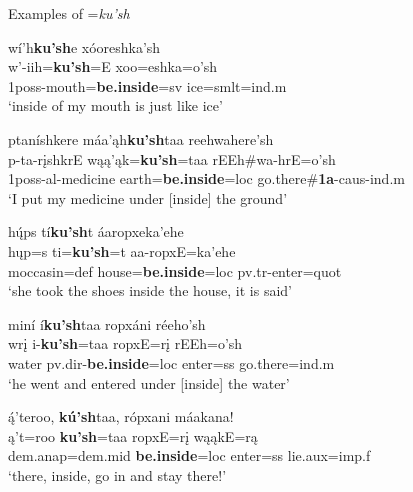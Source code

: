 \begin{exe}

\item\label{ExamplesOfKush} Examples of =\textit{ku'sh}

\begin{xlist}

\item\label{ExamplesOfKush1} \glll wí'h\textbf{ku'sh}e xóoreshka'sh\\
    w'-iih=\textbf{ku'sh}=E xoo=eshka=o'sh\\
    1poss-\textnormal{mouth}=\textbf{\textnormal{\bfseries be.inside}}=sv \textnormal{ice}=smlt=ind.m\\
    \glt `inside of my mouth is just like ice' \citep[119]{hollow1973a}

\item\label{ExamplesOfKush2} \glll  ptaníshkere máa'ąh\textbf{ku'sh}taa reehwahere'sh\\
	p-ta-rįshkrE wąą'ąk=\textbf{ku'sh}=taa rEEh\#wa-hrE=o'sh\\
	1poss-al-\textnormal{medicine} \textnormal{earth}=\textbf{\textnormal{\bfseries be.inside}}=loc \textnormal{go.there}\#\textbf{1a}-caus-ind.m\\
	\glt `I put my medicine under [inside] the ground' \citep[48]{hollow1973a}    
	
\item\label{ExamplesOfKush3} \glll hų́ps tí\textbf{ku'sh}t áaropxeka'ehe\\
    hųp=s ti=\textbf{ku'sh}=t aa-ropxE=ka'ehe\\
    \textnormal{moccasin}=def \textnormal{house}=\textbf{\textnormal{\bfseries be.inside}}=loc pv.tr-\textnormal{enter}=quot\\
    \glt `she took the shoes inside the house, it is said' \citep[169]{hollow1973a}
    
\item\label{ExamplesOfKush4} \glll miní í\textbf{ku'sh}taa ropxáni réeho'sh\\
    wrį i-\textbf{ku'sh}=taa ropxE=rį rEEh=o'sh\\
    \textnormal{water} pv.dir-\textbf{\textnormal{\bfseries be.inside}}=loc \textnormal{enter}=ss \textnormal{go.there}=ind.m\\
    \glt `he went and entered under [inside] the water' \citep[10]{hollow1973b}

\item\label{ExamplesOfKush5} \glll ą́'teroo, \textbf{kú'sh}taa, rópxani máakana!\\
    ą't=roo \textbf{ku'sh}=taa ropxE=rį wąąkE=rą\\
    dem.anap=dem.mid \textbf{\textnormal{\bfseries be.inside}}=loc \textnormal{enter}=ss \textnormal{lie}.aux=imp.f\\
    \glt `there, inside, go in and stay there!' \citep[108]{hollow1973b}


\end{xlist}
\end{exe}
